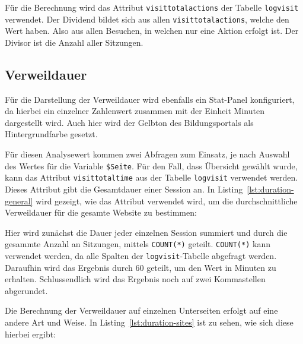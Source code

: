 Für die Berechnung wird das Attribut \texttt{visit\textunderscore total\textunderscore actions} der Tabelle \texttt{log\textunderscore visit} verwendet. Der Dividend bildet sich aus allen \texttt{visit\textunderscore total\textunderscore actions}, welche den Wert \grqq{} haben. Also aus allen Besuchen, in welchen nur eine Aktion erfolgt ist. Der Divisor ist die Anzahl aller Sitzungen.

\subsection{Verweildauer}
Für die Darstellung der Verweildauer wird ebenfalls ein Stat-Panel konfiguriert, da hierbei ein einzelner Zahlenwert zusammen mit der Einheit Minuten dargestellt wird. Auch hier wird der Gelbton des Bildungsportals als Hintergrundfarbe gesetzt.

Für diesen Analysewert kommen zwei Abfragen zum Einsatz, je nach Auswahl des Wertes für die Variable \texttt{\$Seite}. Für den Fall, dass \glqq Übersicht\grqq{} gewählt wurde, kann das Attribut \texttt{visit\textunderscore total\textunderscore time} aus der Tabelle \texttt{log\textunderscore visit} verwendet werden. Dieses Attribut gibt die Gesamtdauer einer Session an. In Listing~\ref{lst:duration-general} wird gezeigt, wie das Attribut verwendet wird, um die durchschnittliche Verweildauer für die gesamte Website zu bestimmen: 

\begin{figure}[H]
    \centering
    \begin{minipage}{\textwidth}
        
    \end{minipage}
\end{figure}

Hier wird zunächst die Dauer jeder einzelnen Session summiert und durch die gesammte Anzahl an Sitzungen, mittels \texttt{COUNT(*)} geteilt. \texttt{COUNT(*)} kann verwendet werden, da alle Spalten der \texttt{log\textunderscore visit}-Tabelle abgefragt werden. Daraufhin wird das Ergebnis durch 60 geteilt, um den Wert in Minuten zu erhalten. Schlussendlich wird das Ergebnis noch auf zwei Kommastellen abgerundet. 

Die Berechnung der Verweildauer auf einzelnen Unterseiten erfolgt auf eine andere Art und Weise. In Listing~\ref{lst:duration-sites} ist zu sehen, wie sich diese hierbei ergibt:

